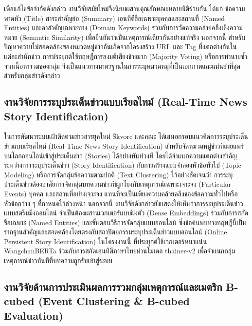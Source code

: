 เพื่อแก้ไขข้อจำกัดดังกล่าว งานวิจัยสมัยใหม่จึงนิยมผสานคุณลักษณะหลายมิติร่วมกัน ได้แก่ ข้อความพาดหัว (Title) สาระสำคัญย่อ (Summary) เอนทิตีชื่อเฉพาะบุคคลและสถานที่ (Named Entities) และคำสำคัญเฉพาะทาง (Domain Keywords) ร่วมกับการวัดความคล้ายคลึงเชิงความหมาย (Semantic Similarity) เพื่อยืนยันว่าเป็นเหตุการณ์เดียวกันอย่างแท้จริง นอกจากนี้ สำหรับปัญหาความไม่สอดคล้องของหมวดหมู่ข่าวอันเกิดจากโครงสร้าง URL และ Tag ที่แตกต่างกันในแต่ละสำนักข่าว การประยุกต์ใช้ทฤษฎีการลงมติเสียงข้างมาก (Majority Voting) หรือการทำนายซ้ำจากเนื้อหารวมของกลุ่ม จึงเป็นแนวทางมาตรฐานในการระบุหมวดหมู่ที่เป็นเอกภาพและแม่นยำที่สุดสำหรับกลุ่มข่าวดังกล่าว

\subsection{งานวิจัยการระบุประเด็นข่าวแบบเรียลไทม์ (Real-Time News Story Identification)}

ในการพัฒนาระบบเฝ้าติดตามข่าวสารยุคใหม่ Škvorc และคณะ \parencite{skvorc2025realtime} ได้เสนอกรอบแนวคิดการระบุประเด็นข่าวแบบเรียลไทม์ (Real-Time News Story Identification) สำหรับจัดหมวดหมู่ข่าวที่เผยแพร่บนโลกออนไลน์เข้าสู่ประเด็นข่าว (Stories) ได้อย่างทันท่วงที โดยได้จำแนกความแตกต่างสำคัญระหว่างการระบุประเด็นข่าว (Story Identification) กับการสร้างแบบจำลองหัวข้อทั่วไป (Topic Modeling) หรือการจัดกลุ่มข้อความตามปกติ (Text Clustering) ไว้อย่างชัดเจนว่า การระบุประเด็นข่าวต้องอาศัยการจัดกลุ่มบทความข่าวที่ผูกโยงกับเหตุการณ์เฉพาะเจาะจง (Particular Events) บุคคล และสถานที่อย่างเจาะจง แทนที่จะเป็นเพียงความคล้ายคลึงของข้อความทั่วไปหรือหัวข้อกว้าง ๆ ที่กำหนดไว้ล่วงหน้า นอกจากนี้ งานวิจัยดังกล่าวยังแสดงให้เห็นว่าการระบุประเด็นข่าวแบบสตรีมมิ่งออนไลน์ จำเป็นต้องผสานเวกเตอร์แบบฝังตัว (Dense Embeddings) ร่วมกับการสกัดชื่อเฉพาะ (Named Entities) และขั้นตอนวิธีการจัดกลุ่มแบบออนไลน์ ซึ่งข้อค้นพบทางทฤษฎีนี้เป็นรากฐานสำคัญและสอดคล้องโดยตรงกับสถาปัตยกรรมระบุประเด็นข่าวแบบออนไลน์ (Online Persistent Story Identification) ในโครงงานนี้ ที่ประยุกต์ใช้เวกเตอร์หนาแน่น WangchanBERTa ร่วมกับการสกัดเอนทิตีภาษาไทยผ่านโมเดล thainer-v2 เพื่อจำแนกกลุ่มเหตุการณ์ข่าวทันทีที่บทความถูกรับเข้าสู่ระบบ

\subsection{งานวิจัยด้านการประเมินผลการรวมกลุ่มเหตุการณ์และเมตริก B-cubed (Event Clustering \& B-cubed Evaluation)}


